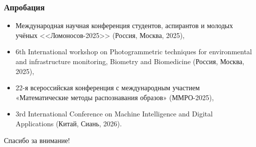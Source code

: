 \begin{frame}
    \frametitle{Апробация}
    \begin{itemize}
        \item Международная научная конференция студентов, аспирантов и молодых учёных <<Ломоносов-2025>> (Россия, Москва, 2025),
        \item 6th International workshop on Photogrammetric techniques for environmental and infrastructure monitoring, Biometry and Biomedicine (Россия, Москва, 2025),
        \item 22-я всероссийская конференция с международным участием «Математические методы распознавания образов» (ММРО-2025),
        \item 3rd International Conference on Machine Intelligence and Digital Applications (Китай, Сиань, 2026).
    \end{itemize}
\end{frame}

\begin{frame} %
    \begin{center}
        \Huge
        Спасибо за внимание!
    \end{center}
\end{frame}
